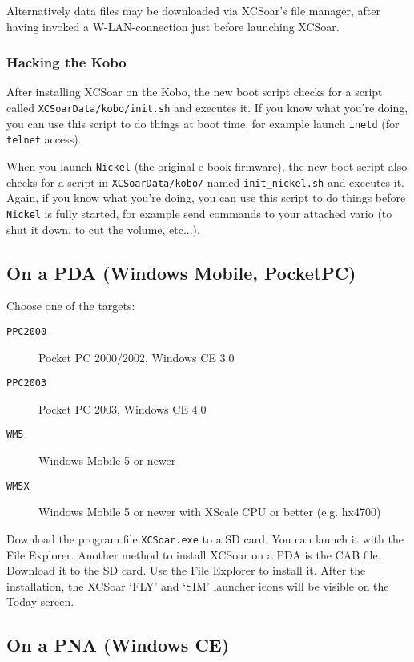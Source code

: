 Alternatively data files may be downloaded via XCSoar's file manager, after having invoked a W-LAN-connection just before launching XCSoar.  

\subsubsection{Hacking the Kobo}

After installing XCSoar on the Kobo, the new boot script checks for a
script called \texttt{XCSoarData/kobo/init.sh} and executes it.  If
you know what you're doing, you can use this script to do things at
boot time, for example launch \texttt{inetd} (for \texttt{telnet}
access).

When you launch \texttt{Nickel} (the original e-book firmware), the new
boot script also checks for a script in \texttt{XCSoarData/kobo/} named
\texttt{init\_nickel.sh} and executes it. Again, if
you know what you're doing, you can use this script to do things
before \texttt{Nickel} is fully started, for example send commands
to your attached vario (to shut it down, to cut the volume, etc...).

\subsection*{On a PDA (Windows Mobile, PocketPC)}

Choose one of the targets:

\begin{description}
\item[\texttt{PPC2000}] Pocket PC 2000/2002, Windows CE 3.0
\item[\texttt{PPC2003}] Pocket PC 2003, Windows CE 4.0
\item[\texttt{WM5}] Windows Mobile 5 or newer
\item[\texttt{WM5X}] Windows Mobile 5 or newer with XScale CPU or
  better (e.g. hx4700)
\end{description}

Download the program file \verb|XCSoar.exe| to a SD card.  You can
launch it with the File Explorer.
Another method to install XCSoar on a PDA is the CAB file.  Download
it to the SD card.  Use the File Explorer to install it.  After the
installation, the XCSoar `FLY' and `SIM' launcher icons will be
visible on the Today screen.


\subsection*{On a PNA (Windows CE)}

